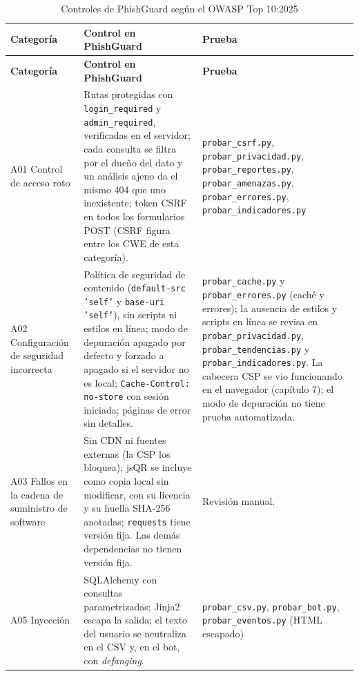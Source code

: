 \documentclass[journal,onecolumn,12pt,draftclsnofoot]{IEEEtran}
\begin{document}
\begingroup
\footnotesize
\setlength{\tabcolsep}{3pt}
\begin{longtable}{|>{\raggedright\arraybackslash}p{}|>{\raggedright\arraybackslash}p{}|>{\raggedright\arraybackslash}p{}|}
\caption{Controles de PhishGuard según el OWASP Top 10:2025}\label{tab:owasp}\\
\hline
\textbf{Categoría} & \textbf{Control en PhishGuard} & \textbf{Prueba} \\ \hline
\endfirsthead
\hline
\textbf{Categoría} & \textbf{Control en PhishGuard} & \textbf{Prueba} \\ \hline
\endhead
A01 Control de acceso roto & Rutas protegidas con \texttt{login\_required} y \texttt{admin\_required}, verificadas en el servidor; cada consulta se filtra por el dueño del dato y un análisis ajeno da el mismo 404 que uno inexistente; token CSRF en todos los formularios POST (CSRF figura entre los CWE de esta categoría). & \texttt{probar\_csrf.py}, \texttt{probar\_privacidad.py}, \texttt{probar\_reportes.py}, \texttt{probar\_amenazas.py}, \texttt{probar\_errores.py}, \texttt{probar\_indicadores.py} \\ \hline
A02 Configuración de seguridad incorrecta & Política de seguridad de contenido (\texttt{default-src 'self'} y \texttt{base-uri 'self'}), sin scripts ni estilos en línea; modo de depuración apagado por defecto y forzado a apagado si el servidor no es local; \texttt{Cache-Control: no-store} con sesión iniciada; páginas de error sin detalles. & \texttt{probar\_cache.py} y \texttt{probar\_errores.py} (caché y errores); la ausencia de estilos y scripts en línea se revisa en \texttt{probar\_privacidad.py}, \texttt{probar\_tendencias.py} y \texttt{probar\_indicadores.py}. La cabecera CSP se vio funcionando en el navegador (capítulo 7); el modo de depuración no tiene prueba automatizada. \\ \hline
A03 Fallos en la cadena de suministro de software & Sin CDN ni fuentes externas (la CSP los bloquea); jsQR se incluye como copia local sin modificar, con su licencia y su huella SHA-256 anotadas; \texttt{requests} tiene versión fija. Las demás dependencias no tienen versión fija. & Revisión manual. \\ \hline
A05 Inyección & SQLAlchemy con consultas parametrizadas; Jinja2 escapa la salida; el texto del usuario se neutraliza en el CSV y, en el bot, con \emph{defanging}. & \texttt{probar\_csv.py}, \texttt{probar\_bot.py}, \texttt{probar\_eventos.py} (HTML escapado) \\ \hline

\end{longtable}
\end{document}
